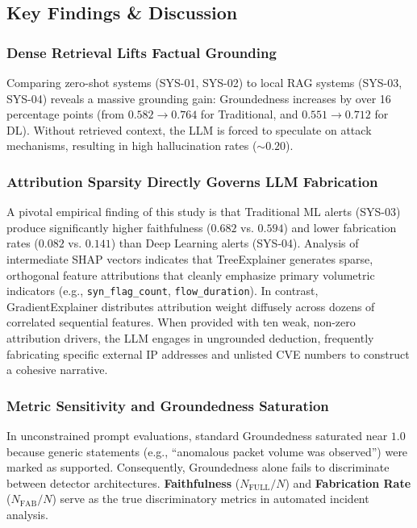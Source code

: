 \documentclass[conference]{IEEEtran}
\begin{document}
\subsection{Key Findings \& Discussion}

\subsubsection{Dense Retrieval Lifts Factual Grounding}
Comparing zero-shot systems (SYS-01, SYS-02) to local RAG systems (SYS-03, SYS-04) reveals a massive grounding gain: Groundedness increases by over 16 percentage points (from $0.582 \to 0.764$ for Traditional, and $0.551 \to 0.712$ for DL). Without retrieved context, the LLM is forced to speculate on attack mechanisms, resulting in high hallucination rates ($\sim 0.20$).

\subsubsection{Attribution Sparsity Directly Governs LLM Fabrication}
A pivotal empirical finding of this study is that Traditional ML alerts (SYS-03) produce significantly higher faithfulness ($0.682$ vs. $0.594$) and lower fabrication rates ($0.082$ vs. $0.141$) than Deep Learning alerts (SYS-04). Analysis of intermediate SHAP vectors indicates that TreeExplainer generates sparse, orthogonal feature attributions that cleanly emphasize primary volumetric indicators (e.g., \texttt{syn\_flag\_count}, \texttt{flow\_duration}). In contrast, GradientExplainer distributes attribution weight diffusely across dozens of correlated sequential features. When provided with ten weak, non-zero attribution drivers, the LLM engages in ungrounded deduction, frequently fabricating specific external IP addresses and unlisted CVE numbers to construct a cohesive narrative.

\subsubsection{Metric Sensitivity and Groundedness Saturation}
In unconstrained prompt evaluations, standard Groundedness saturated near $1.0$ because generic statements (e.g., ``anomalous packet volume was observed'') were marked as supported. Consequently, Groundedness alone fails to discriminate between detector architectures. \textbf{Faithfulness} ($N_{\text{FULL}}/N$) and \textbf{Fabrication Rate} ($N_{\text{FAB}}/N$) serve as the true discriminatory metrics in automated incident analysis.
\end{document}
